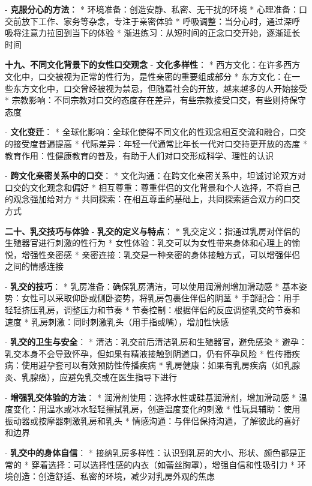 \begin{enumerate}
  - \textbf{克服分心的方法}：
    * 环境准备：创造安静、私密、无干扰的环境
    * 心理准备：口交前放下工作、家务等杂念，专注于亲密体验
    * 呼吸调整：当分心时，通过深呼吸将注意力拉回到当下的体验
    * 渐进练习：从短时间的正念口交开始，逐渐延长时间

  \textbf{十九、不同文化背景下的女性口交观念}
  - \textbf{文化多样性}：
    * 西方文化：在许多西方文化中，口交被视为正常的性行为，是性亲密的重要组成部分
    * 东方文化：在一些东方文化中，口交曾经被视为禁忌，但随着社会的开放，越来越多的人开始接受
    * 宗教影响：不同宗教对口交的态度存在差异，有些宗教接受口交，有些则持保守态度

  - \textbf{文化变迁}：
    * 全球化影响：全球化使得不同文化的性观念相互交流和融合，口交的接受度普遍提高
    * 代际差异：年轻一代通常比年长一代对口交持更开放的态度
    * 教育作用：性健康教育的普及，有助于人们对口交形成科学、理性的认识

  - \textbf{跨文化亲密关系中的口交}：
    * 文化沟通：在跨文化亲密关系中，坦诚讨论双方对口交的文化观念和偏好
    * 相互尊重：尊重伴侣的文化背景和个人选择，不将自己的观念强加给对方
    * 共同探索：在相互尊重的基础上，共同探索适合双方的口交方式

  \textbf{二十、乳交技巧与体验}
  - \textbf{乳交的定义与特点}：
    * 乳交定义：指通过乳房对伴侣的生殖器官进行刺激的性行为
    * 女性体验：乳交可以为女性带来身体和心理上的愉悦，增强性亲密感
    * 亲密连接：乳交是一种亲密的身体接触方式，可以增强伴侣之间的情感连接

  - \textbf{乳交的技巧}：
    * 乳房准备：确保乳房清洁，可以使用润滑剂增加滑动感
    * 基本姿势：女性可以采取仰卧或侧卧姿势，将乳房包裹住伴侣的阴茎
    * 手部配合：用手轻轻挤压乳房，调整压力和节奏
    * 节奏控制：根据伴侣的反应调整乳交的节奏和速度
    * 乳房刺激：同时刺激乳头（用手指或嘴），增加性快感

  - \textbf{乳交的卫生与安全}：
    * 清洁：乳交前后清洁乳房和生殖器官，避免感染
    * 避孕：乳交本身不会导致怀孕，但如果有精液接触到阴道口，仍有怀孕风险
    * 性传播疾病：使用避孕套可以有效预防性传播疾病
    * 乳房健康：如果有乳房疾病（如乳腺炎、乳腺癌），应避免乳交或在医生指导下进行

  - \textbf{增强乳交体验的方法}：
    * 润滑剂使用：选择水性或硅基润滑剂，增加滑动感
    * 温度变化：用温水或冰水轻轻擦拭乳房，创造温度变化的刺激
    * 性玩具辅助：使用振动器或按摩器刺激乳房和乳头
    * 情感沟通：与伴侣保持沟通，了解彼此的喜好和边界

  - \textbf{乳交中的身体自信}：
    * 接纳乳房多样性：认识到乳房的大小、形状、颜色都是正常的
    * 穿着选择：可以选择性感的内衣（如蕾丝胸罩），增强自信和性吸引力
    * 环境创造：创造舒适、私密的环境，减少对乳房外观的焦虑


\end{enumerate}
